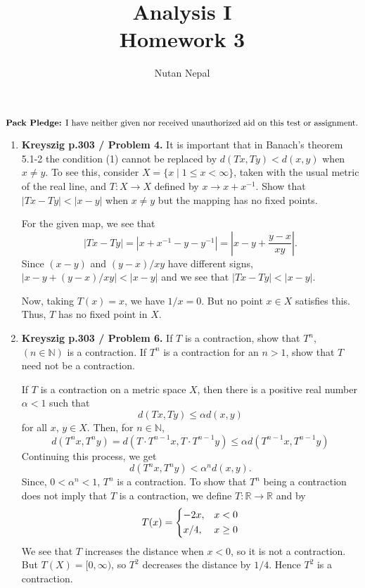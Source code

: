 \documentclass[12pt]{article}
\title{Analysis I \\
\large Homework 3
}
\author{Nutan Nepal}
\newcommand{\rl}{\mathbb{R}}
\newcommand{\packpledge}{
    $\text{{\bf Pack Pledge:} I have neither given nor
    received unauthorized aid on this
    test or assignment.}$}
\begin{document}
\maketitle
\packpledge\\
\makebox[\linewidth]{\rule{200mm}{1pt}}
\vspace{1mm}

\begin{enumerate}

\item \textbf{Kreyszig p.303 / Problem 4.}
    It is important that in Banach's theorem 5.1-2
    the condition (1) cannot be replaced by $d(Tx,Ty)
    < d(x,y)$ when $x \neq y$. To see this, consider
    $X = \{x \mid 1 \leq x < \infty \}$, taken with
    the usual metric of the real line, and $T: X \to X$
    defined by $x \to x + x^{-1}$. Show that $|Tx-Ty| <
    |x-y|$ when $x \neq y$ but the mapping has
    no fixed points.

\begin{mybox}

    For the given map, we see that $$|Tx-Ty|=
    |x+x^{-1}-y-y^{-1}|=\left|x-y+\frac{y-x}{xy}\right|.$$
    Since $(x-y)$ and $(y-x)/xy$ have different signs,
    $\left|x-y+(y-x)/xy\right|<|x-y|$ and we
    see that $|Tx-Ty|<|x-y|$.
    
    \vspace*{3mm}
    Now, taking $T(x)=x$, we have $1/x=0$. But no point
    $x\in X$ satisfies this. Thus, $T$ has no fixed point
    in $X$.
\end{mybox}


\item {\bf Kreyszig p.303 / Problem 6.}
    If $T$ is a contraction, show that $T^n$,
    $(n \in \mathbb{N})$ is a contraction. If $T^n$ is a
    contraction for an $n > 1$, show that $T$
    need not be a contraction. 
\begin{mybox}

    If $T$ is a contraction on a metric space $X$,
    then there is a positive
    real number $\alpha<1$ such that
    $$d(Tx,Ty)\leq \alpha d(x,y)$$
    for all $x$, $y\in X$. Then, for $n\in \mathbb{N}$,
    $$d(T^nx,T^ny)=d(T\cdot T^{n-1}x, T\cdot T^{n-1}y)
    \leq \alpha d(T^{n-1}x, T^{n-1}y)$$
    Continuing this process, we get
    $$d(T^nx,T^ny)<\alpha^n d(x,y).$$
    Since, $0<\alpha^n<1$, $T^n$ is a contraction.
    To show that $T^n$ being a contraction does
    not imply that $T$ is a contraction, we define $T:\rl
    \to \rl$ and by
    $$T(x)=
    \begin{dcases}
        -2x,   & x<0\\
        x/4,  & x\geq 0
    \end{dcases}$$
    We see that $T$ increases the distance when $x<0$, so
    it is not a contraction. But $T(X)=[0,\infty)$, so
    $T^2$ decreases the distance by $1/4$. Hence $T^2$
    is a contraction.
\end{mybox}
 

\end{enumerate}
\end{document}
